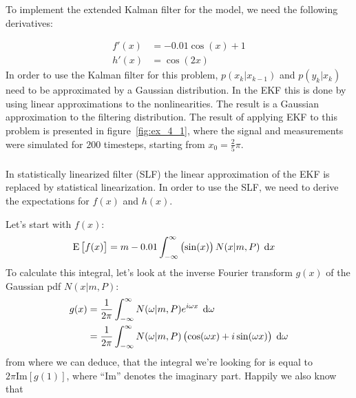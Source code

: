 \documentclass[a4paper,oneside,article]{memoir}
\begin{document}
\subsubsection{}\label{sec:4_1a}
To implement the extended Kalman filter for the model, we need the
following derivatives:

\begin{align}
	f'(x)&=-0.01\cos(x)+1\\
	h'(x)&=\cos(2x)
\end{align}
In order to use the Kalman filter for this problem,
$p\left(x_{k}|x_{k-1}\right)$ and $p\left(y_{k}|x_{k}\right)$ need to
be approximated by a Gaussian distribution. In the EKF this is done
by using linear approximations to the nonlinearities. The result
is a Gaussian approximation to the filtering distribution. The result
of applying EKF to this problem is presented in figure~\ref{fig:ex_4_1},
where the signal and measurements were simulated for $200$ timesteps, starting
from $x_0=\frac{2}{5}\pi$.


\subsubsection{}\label{sec:4_1b}

In statistically linearized filter (SLF) the linear approximation
of the EKF is replaced by statistical linearization. In order to use
the SLF, we need to derive the expectations for $f(x)$ and $h(x)$.

Let's start with $f(x)$:
\begin{align}
	\E{f(x)}&=m-0.01\defint{-\infty}{\infty}{\left(\sin(x)\right)N(x|m,P)}{x}
\end{align}
To calculate this integral, let's look at the inverse Fourier transform $g(x)$ of the Gaussian pdf $N(x|m,P)$:
\begin{align}
	g(x)&=\frac{1}{2\pi}\defint{-\infty}{\infty}{N(\omega|m,P)e^{i\omega x}}{\omega}\\
	&=\frac{1}{2\pi}\defint{-\infty}{\infty}{N(\omega|m,P)\left(\cos(\omega x)+i\sin(\omega x)\right)}{\omega}
\end{align}
from where we can deduce, that the integral we're looking for is equal to $2\pi\mathrm{Im}[g(1)]$, where
``Im'' denotes the imaginary part. Happily we also know that
\end{document}
